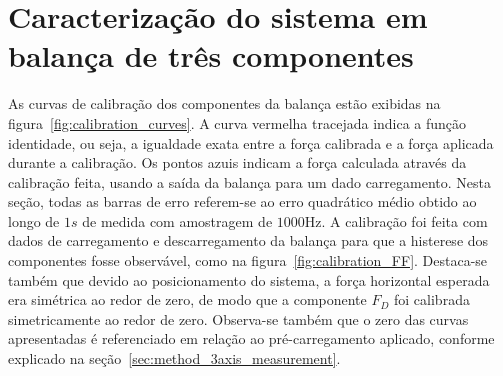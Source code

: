 \section{Caracterização do sistema em balança de três componentes}\label{sec:result_characterization}

As curvas de calibração dos componentes da balança estão exibidas na figura~\ref{fig:calibration_curves}. A curva vermelha tracejada indica a função identidade, ou seja, a igualdade exata entre a força calibrada e a força aplicada durante a calibração. Os pontos azuis indicam a força calculada através da calibração feita, usando a saída da balança para um dado carregamento. Nesta seção, todas as barras de erro referem-se ao erro quadrático médio obtido ao longo de \(1s\) de medida com amostragem de \(1000\mathrm{Hz}\). A calibração foi feita com dados de carregamento e descarregamento da balança para que a histerese dos componentes fosse observável, como na figura~\ref{fig:calibration_FF}. Destaca-se também que devido ao posicionamento do sistema, a força horizontal esperada era simétrica ao redor de zero, de modo que a componente \(F_D\) foi calibrada simetricamente ao redor de zero. Observa-se também que o zero das curvas apresentadas é referenciado em relação ao pré-carregamento aplicado, conforme explicado na seção~\ref{sec:method_3axis_measurement}.

